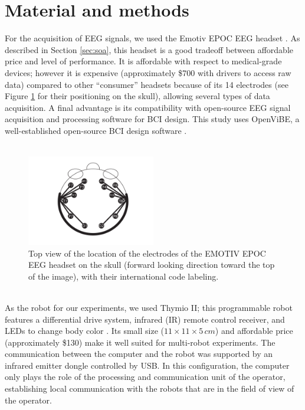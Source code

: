 \documentclass[smallextended]{svjour3}
\begin{document}
\section{Material and methods}
\label{sec:methods}
For the acquisition of EEG signals, we used the Emotiv EPOC EEG headset \cite{stytsenko2011evaluation}. 
As described in Section \ref{sec:soa}, this headset is a good tradeoff between affordable price and level of performance. 
It is affordable with respect to medical-grade devices; however it is expensive (approximately \$700 with drivers to access raw data) compared to other ``consumer'' headsets because of its 14 electrodes (see Figure \ref{fig:electrodes} for their positioning on the skull), allowing several types of data acquisition. 
A final advantage is its compatibility with open-source EEG signal acquisition and processing software for BCI design. This study uses OpenViBE, a well-established open-source BCI design software \cite{ov_publication}.\\
\\
\begin{figure}
\center
\includegraphics[width=0.5\textwidth]{figures/emotiv-electrodes.pdf}
\caption{Top view of the location of the electrodes of the EMOTIV EPOC EEG headset on the skull (forward looking direction toward the top of the image), with their international code labeling.} \label{fig:electrodes}
\end{figure}
\\
As the robot for our experiments, we used Thymio II; this programmable robot features a differential drive system, infrared (IR) remote control receiver, and LEDs to change body color \cite{Riedo-et-al-2013}. Its small size ($11 \times 11 \times 5\,\mathit{cm}$) and affordable price (approximately \$130) make it well suited for multi-robot experiments. 
The communication between the computer and the robot was supported by an infrared emitter dongle controlled by USB. 
In this configuration, the computer only plays the role of the processing and communication unit of the operator, establishing local communication with the robots that are in the field of view of the operator.\\
\end{document}
